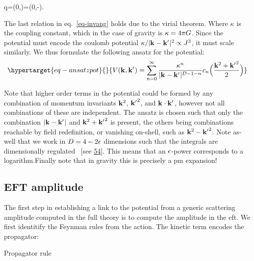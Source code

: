 \documentclass[
  10pt,
  a4paper,
  DIV=11,
  numbers=noendperiod,
  twoside]{scrreprt}
\let\[\relax \let\]\relax %
\DeclareRobustCommand{\[}{\begin{equation}}
\DeclareRobustCommand{\]}{\end{equation}}
\begin{document}
\[
q=(0,)=(0,-).
\]

The last relation in eq.~\ref{eq-invang} holds due to the virial
theorem. Where \(\kappa\) is the coupling constant, which in the case of
gravity is \(\kappa=4\pi G\). Since the potential must encode the
coulomb potential \(\kappa/\vert\mathbf{{k}}_{}-\mathbf{{k'}}_{} \vert^2\propto J^3\), it must
scale similarly. We thus formulate the following ansatz for the
potential: \begin{equation}\protect\hypertarget{eq-ansatzpot}{}{
\pot(\tv{k},\tv{k'})=\sum_{n=0}^\infty \frac{\kappa^n}{\abs{\tv{k}-\tv{k'}}^{\Dim-1-n}} c_n\pa[\Big]{\frac{\tv{k}^2+\tv{k'}^2}{2}}
}\label{eq-ansatzpot}\end{equation}

Note that higher order terms in the potential could be formed by any
combination of momentum invariants \(\mathbf{{k}}_{}^2\), \(\mathbf{{k'}}_{}^2\), and
\(\mathbf{{k}}_{}\cdot\mathbf{{k'}}_{}\), however not all combinations of these are
independent. The ansatz is chosen such that only the combination
\(\vert\mathbf{{k}}_{}-\mathbf{{k'}}_{} \vert\) and \(\mathbf{{k}}_{}^2+\mathbf{{k'}}_{}^2\) is present, the
others being combinations reachable by field redefinition, or vanishing
on-shell, such as \(\mathbf{{k}}_{}^2-\mathbf{{k'}}_{}^2\). Note as-well that we work in
\(D=4-2\epsilon\) dimensions such that the integrals are dimensionally
regulated ~{[}see \protect\hyperlink{ref-tHooft:1972tcz}{54}{]}. This
means that an \(\epsilon\)-power corresponds to a
logarithm.Finally
note that in gravity this is precisely a \gls{pm} expansion!

\hypertarget{eft-amplitude}{%
\subsection{EFT amplitude}\label{eft-amplitude}}

The first step in establishing a link to the potential from a generic
scattering amplitude computed in the full theory is to compute the
amplitude in the \gls{eft}. We first identitify the Feynman rules from
the action. The kinetic term encodes the propagator:

\hypertarget{fig-propagator}{}
{
\makeatletter
\def\LT@makecaption#1#2#3{%
  \noalign{\smash{\hbox{\kern\textwidth\rlap{\kern\marginparsep
  \parbox[t]{\marginparwidth}{%
    \footnotesize{%
      \vspace{(1.1\baselineskip)}
    #1{#2: }\ignorespaces #3}}}}}}%
    }
\makeatother



\label{fig-propagator}Propagator rule

}
\end{document}
